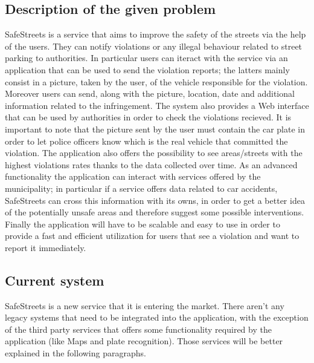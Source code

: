 \subsection{Description of the given problem}
SafeStreets is a service that aims to improve the safety of the streets via the help of the users. They can notify violations or any illegal behaviour related to street parking to authorities. In particular users can iteract with the service via an application that can be used to send the violation reports; the latters mainly consist in a picture, taken by the user, of the vehicle responsible for the violation. Moreover users can send, along with the picture, location, date and additional information related to the infringement. The system also provides a Web interface that can be used by authorities in order to check the violations recieved. It is important to note that the picture sent by the user must contain the car plate in order to let police officers know which is the real vehicle that committed the violation. The application also offers the possibility to see areas/streets with the highest violations rates thanks to the data collected over time. As an advanced functionality the application can interact with services offered by the municipality; in particular if a service offers data related to car accidents, SafeStreets can cross this information with its owns, in order to get a better idea of the potentially unsafe areas and therefore suggest some possible interventions. Finally the application will have to be scalable and easy to use in order to provide a fast and efficient utilization for users that see a violation and want to report it immediately.

\subsection{Current system}
SafeStreets is a new service that it is entering the market. There aren't any legacy systems that need to be integrated into the application, with the exception of the third party services that offers some functionality required by the application (like Maps and plate recognition). Those services will be better explained in the following paragraphs.



